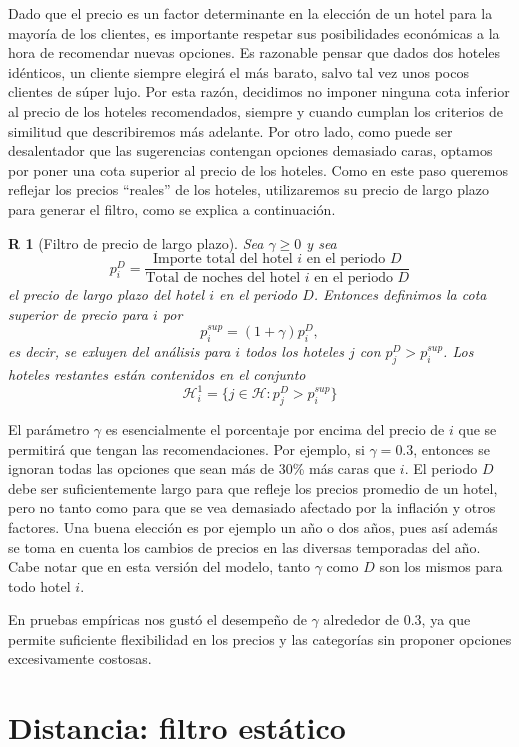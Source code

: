 \documentclass[12pt]{report}
\newtheorem{regla}{R}%
\begin{document}
Dado que el precio es un factor determinante en la elección de un hotel para la mayoría de los clientes, es importante respetar sus posibilidades económicas a la hora de recomendar nuevas opciones. Es razonable pensar que dados dos hoteles idénticos, un cliente siempre elegirá el más barato, salvo tal vez unos pocos clientes de súper lujo. Por esta razón, decidimos no imponer ninguna cota inferior al precio de los hoteles recomendados, siempre y cuando cumplan los criterios de similitud que describiremos más adelante. Por otro lado, como puede ser desalentador que las sugerencias contengan opciones demasiado caras, optamos por poner una cota superior al precio de los hoteles. Como en este paso queremos reflejar los precios ``reales'' de los hoteles, utilizaremos su precio de largo plazo para generar el filtro, como se explica a continuación.
\begin{regla}[Filtro de precio de largo plazo]
Sea $\gamma \geq 0$ y sea
\[
p^D_i = \frac{\text{Importe total del hotel $i$ en el periodo $D$}}{\text{Total de noches del hotel $i$ en el periodo $D$}}
\]
el precio de largo plazo del hotel $i$ en el periodo $D$. Entonces definimos la cota superior de precio para $i$ por 
\[
p^{sup}_i = (1 + \gamma)p^D_i,
\]
es decir, se exluyen del análisis para $i$ todos los hoteles $j$ con $p^D_j > p^{sup}_i$. Los hoteles restantes están contenidos en el conjunto
\[
\mathcal{H}_i^1 = \{j \in \mathcal{H} : p^D_j > p^{sup}_i\}
\]
\end{regla}
El parámetro $\gamma$ es esencialmente el porcentaje por encima del precio de $i$ que se permitirá que tengan las recomendaciones. Por ejemplo, si $\gamma = 0.3$, entonces se ignoran todas las opciones que sean más de 30\% más caras que $i$. El periodo $D$ debe ser suficientemente largo para que refleje los precios promedio de un hotel, pero no tanto como para que se vea demasiado afectado por la inflación y otros factores. Una buena elección es por ejemplo un año o dos años, pues así además se toma en cuenta los cambios de precios en las diversas temporadas del año. Cabe notar que en esta versión del modelo, tanto $\gamma$ como $D$ son los mismos para todo hotel $i$.

En pruebas empíricas nos gustó el desempeño de $\gamma$ alrededor de 0.3, ya que permite suficiente flexibilidad en los precios y las categorías sin proponer opciones excesivamente costosas.

\section{Distancia: filtro estático}
\end{document}
